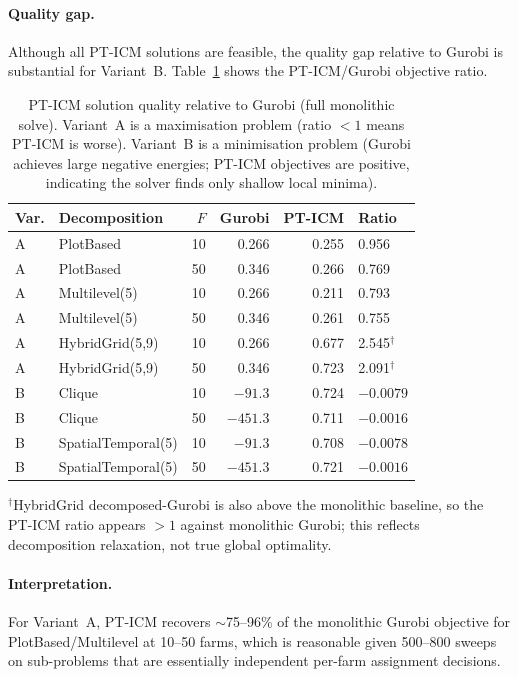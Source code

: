 \documentclass[11pt,a4paper]{article}
\begin{document}
\paragraph{Quality gap.}
Although all PT-ICM solutions are feasible, the quality gap relative to Gurobi is
substantial for Variant~B.  Table~\ref{tab:quality-ratio} shows the PT-ICM/Gurobi
objective ratio.

\begin{table}[H]
\centering
\caption{PT-ICM solution quality relative to Gurobi (full monolithic solve).
  Variant~A is a maximisation problem (ratio $<1$ means PT-ICM is worse).
  Variant~B is a minimisation problem (Gurobi achieves large negative energies;
  PT-ICM objectives are positive, indicating the solver finds only shallow local
  minima).}
\label{tab:quality-ratio}
\begin{tabular}{llrrrl}
\toprule
\textbf{Var.} & \textbf{Decomposition} & $F$ & \textbf{Gurobi} & \textbf{PT-ICM} & \textbf{Ratio} \\
\midrule
A & PlotBased        &  10 & 0.266 & 0.255 & 0.956 \\
A & PlotBased        &  50 & 0.346 & 0.266 & 0.769 \\
A & Multilevel(5)    &  10 & 0.266 & 0.211 & 0.793 \\
A & Multilevel(5)    &  50 & 0.346 & 0.261 & 0.755 \\
A & HybridGrid(5,9)  &  10 & 0.266 & 0.677 & 2.545$^\dagger$ \\
A & HybridGrid(5,9)  &  50 & 0.346 & 0.723 & 2.091$^\dagger$ \\
\midrule
B & Clique           &  10 & $-91.3$ & 0.724 & $-0.0079$ \\
B & Clique           &  50 & $-451.3$ & 0.711 & $-0.0016$ \\
B & SpatialTemporal(5) &10 & $-91.3$ & 0.708 & $-0.0078$ \\
B & SpatialTemporal(5) &50 & $-451.3$ & 0.721 & $-0.0016$ \\
\bottomrule
\end{tabular}

\smallskip
$^\dagger$HybridGrid decomposed-Gurobi is also above the monolithic baseline,
so the PT-ICM ratio appears $>1$ against monolithic Gurobi; this reflects
decomposition relaxation, not true global optimality.
\end{table}

\paragraph{Interpretation.}
For Variant~A, PT-ICM recovers $\sim$75--96\% of the monolithic Gurobi objective
for PlotBased/Multilevel at 10--50 farms, which is reasonable given 500--800 sweeps
on sub-problems that are essentially independent per-farm assignment decisions.
\end{document}
